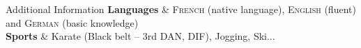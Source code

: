 %
%
%

\begin{rubriquetableau}[\offsetintab]{Additional Information}
    \textbf{Languages}
    & \textsc{French} (native language), \textsc{English}
    (fluent) and \textsc{German} (basic knowledge)
    \\
    \textbf{Sports}
    & Karate (Black belt -- {\small 3rd DAN}, \acf{DIF}), Jogging, Ski...
    \\
\end{rubriquetableau}

%
